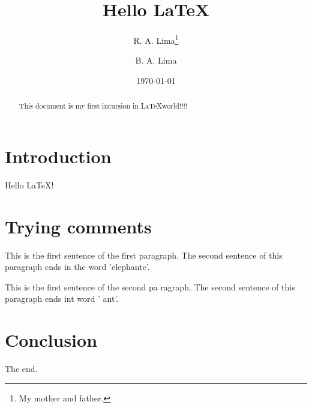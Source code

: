 \documentclass[a4papper,11pt]{article}
\author{R. A. Lima\thanks{My mother and father.} \and B. A. Lima}
\title{Hello \LaTeX}
\date{\today}
\begin{document}
  \maketitle
  \begin{abstract}
    This document is my first incursion in \LaTeX world!!!!
  \end{abstract}
  \section{Introduction}
    Hello \LaTeX!
  \section{Trying comments}
    This is the first     sentence of the first paragraph.
    The second sentence of this paragraph ends in the word 'elephante'.

    This is the first sentence of the second pa%
    ragraph.
    The second sentence of this paragraph ends int word '%
    ant'.
  \section{Conclusion}
    The end.
\end{document}
